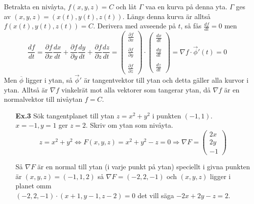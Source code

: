 \documentclass[a4paper,12pt]{article}
\newcommand{\partialfrac}[2]{\frac{\partial #1}{\partial #2}}
\begin{document}
  Betrakta en nivåyta, $f(x,y,z) = C$ och låt $\Gamma$ vaa en kurva på denna
  yta. $\Gamma$ ges av $(x,y,z)=(x(t),y(t),z(t))$. Längs denna kurva är alltså
  $f(x(t), y(t), z(t)) = C$. Derivera med avseende på $t$, så fås
  $\frac{df}{dt}=0$ men
  \begin{equation*}
    \frac{df}{dt} =
    \partialfrac{f}{x} \frac{dx}{dt} +
    \partialfrac{f}{y} \frac{dy}{dt} +
    \partialfrac{f}{z} \frac{dz}{dt} =
    \begin{pmatrix}
      \partialfrac{f}{x} \\\\
      \partialfrac{f}{y} \\\\
      \partialfrac{f}{z}
    \end{pmatrix}
    \cdot
    \begin{pmatrix}
      \frac{dx}{dt} \\\\
      \frac{dy}{dt} \\\\
      \frac{dz}{dt}
    \end{pmatrix}
    = \nabla f \cdot \vec{\phi}'(t) = 0
  \end{equation*}
  Men $\overline{\phi}$ ligger i ytan, så $\vec{\phi}'$ är tangentvektor
  till ytan och detta gäller alla kurvor i ytan. Alltså är $\nabla f$ vinkelrät
  mot alla vektorer som tangerar ytan, då $\nabla f$ är en normalvektor till
  nivåytan $f = C$.

\begin{itemize}
\item[\textbf{Ex.3}]
  Sök tangentplanet till ytan $z = x^2+y^2$ i punkten $(-1,1)$. $x=-1, y=1$ ger
  $z=2$. Skriv om ytan som nivåyta.
  \begin{equation*}
    z=x^2+y^2 \Leftrightarrow F(x,y,z) = x^2+y^2-z = 0
    \Rightarrow \nabla F =
    \begin{pmatrix}
      2x \\
      2y \\
      -1
    \end{pmatrix}
  \end{equation*}

  Så $\nabla F$ är en normal till ytan (i varje punkt på ytan) speciellt i givna
  punkten är $(x,y,z)=(-1,1,2)$ så $\nabla F = (-2, 2, -1)$ och $(x,y,z)$ ligger
  i planet omm \\$(-2,2,-1) \cdot (x+1, y-1, z-2) = 0$ det vill säga
  $-2x+2y-z = 2$.
\end{itemize}
\end{document}
